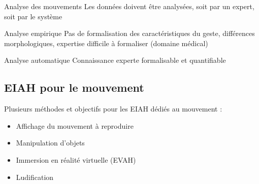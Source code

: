 \iffalse
\begin{frame}{Analyse des mouvements}
        Les données doivent être analysées, soit par un expert, soit par le système

        \begin{block}{Analyse empirique}
            Pas de formalisation des caractéristiques du geste, différences morphologiques, expertise difficile à formaliser (domaine médical)
        \end{block}
        
        \begin{block}{Analyse automatique}
            Connaissance experte formalisable et quantifiable
        \end{block}
     \end{frame}

    \subsection{EIAH pour le mouvement}
    \begin{frame}{\subsecname}
        Plusieurs méthodes et objectifs pour les EIAH dédiés au mouvement :
        \begin{itemize}[label=$\bullet$]
            \item Affichage du mouvement à reproduire 
            \item Manipulation d'objets 
            \item Immersion en réalité virtuelle (EVAH) 
            \item Ludification 
        \end{itemize}

        \vspace{1cm}
    \end{frame}
    
